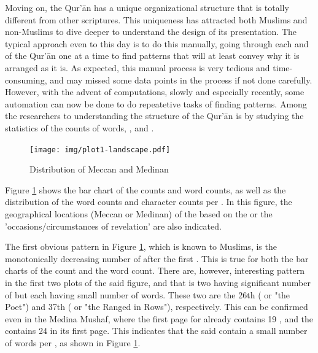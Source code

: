 Moving on, the Qur'\=an has a unique organizational structure that is totally different from other scriptures. This uniqueness has attracted both Muslims and non-Muslims to dive deeper to understand the design of its presentation. The typical approach even to this day is to do this manually, going through each   and   of the Qur'\=an one at a time to find patterns that will at least convey why it is arranged as it is. As expected, this manual process is very tedious and time-consuming, and may missed some data points in the process if not done carefully. However, with the advent of computations, slowly and especially recently, some automation can now be done to do repeatetive tasks of finding patterns. Among the researchers to understanding the structure of the Qur'\=an is by studying the statistics of the counts of words,  , and  .

\begin{landscape}
\begin{figure}[!h]
    \centering
    \texttt{[image: img/plot1-landscape.pdf]}
    \caption{Distribution of Meccan and Medinan  }
    \label{fig:result_ayah_word_count}
\end{figure}
\end{landscape}

Figure \ref{fig:result_ayah_word_count} shows the bar chart of the   counts and word counts, as well as the distribution of the word counts and character counts per  . In this figure, the geographical locations (Meccan or Medinan) of the   based on the   or the 'occasions/circumstances of revelation' are also indicated.

The first obvious pattern in Figure \ref{fig:result_ayah_word_count}, which is known to Muslims, is the monotonically decreasing number of   after the first  . This is true for both the bar charts of the   count and the word count. There are, however, interesting pattern in the first two plots of the said figure, and that is two   having significant number of   but each having small number of words. These two   are the 26th   (  or "the Poet") and 37th   (  or "the Ranged in Rows"), respectively. This can be confirmed even in the Medina Mushaf, where the first page for   already contains 19  , and the   contains 24   in its first page. This indicates that the said   contain a small number of words per  , as shown in Figure \ref{fig:result_ayah_word_count}.


